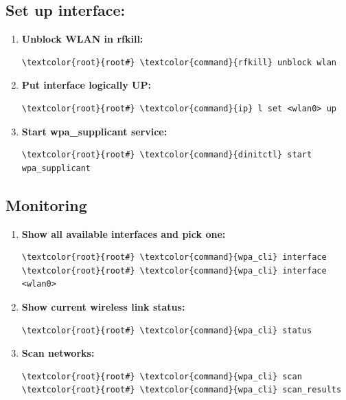 \documentclass[10pt, a4paper, onecolumn, oneside, titlepage, openany]{book}
\begin{document}
\subsection{Set up interface:}
\begin{enumerate}
    \item \textbf{Unblock WLAN in rfkill:}
\begin{Verbatim}[commandchars=\\\{\}]
\textcolor{root}{root#} \textcolor{command}{rfkill} unblock wlan
\end{Verbatim}
    \item \textbf{Put interface logically UP:}
\begin{Verbatim}[commandchars=\\\{\}]
\textcolor{root}{root#} \textcolor{command}{ip} l set <wlan0> up
\end{Verbatim}
    \item \textbf{Start wpa\_supplicant service:}
\begin{Verbatim}[commandchars=\\\{\}]
\textcolor{root}{root#} \textcolor{command}{dinitctl} start wpa_supplicant
\end{Verbatim}
\end{enumerate}
\subsection{Monitoring}
\begin{enumerate}
    \item \textbf{Show all available interfaces and pick one:}
\begin{Verbatim}[commandchars=\\\{\}]
\textcolor{root}{root#} \textcolor{command}{wpa_cli} interface
\textcolor{root}{root#} \textcolor{command}{wpa_cli} interface <wlan0>
\end{Verbatim}
    \item \textbf{Show current wireless link status:}
\begin{Verbatim}[commandchars=\\\{\}]
\textcolor{root}{root#} \textcolor{command}{wpa_cli} status
\end{Verbatim}
    \item \textbf{Scan networks:}
\begin{Verbatim}[commandchars=\\\{\}]
\textcolor{root}{root#} \textcolor{command}{wpa_cli} scan
\textcolor{root}{root#} \textcolor{command}{wpa_cli} scan_results
\end{Verbatim}
\end{enumerate}
\end{document}
